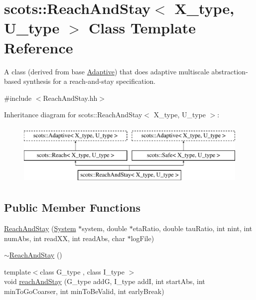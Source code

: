 \hypertarget{classscots_1_1ReachAndStay}{}\section{scots\+:\+:Reach\+And\+Stay$<$ X\+\_\+type, U\+\_\+type $>$ Class Template Reference}
\label{classscots_1_1ReachAndStay}


A class (derived from base \hyperlink{classscots_1_1Adaptive}{Adaptive}) that does adaptive multiscale abstraction-\/based synthesis for a reach-\/and-\/stay specification.  




{\ttfamily \#include $<$Reach\+And\+Stay.\+hh$>$}

Inheritance diagram for scots\+:\+:Reach\+And\+Stay$<$ X\+\_\+type, U\+\_\+type $>$\+:\begin{figure}[H]
\begin{center}
\leavevmode
\includegraphics[height=3.000000cm]{classscots_1_1ReachAndStay}
\end{center}
\end{figure}
\subsection*{Public Member Functions}
\begin{DoxyCompactItemize}
\item 
\hyperlink{classscots_1_1ReachAndStay_ad7b8e64bead2b77ba81d793180b66416}{Reach\+And\+Stay} (\hyperlink{classscots_1_1System}{System} $\ast$system, double $\ast$eta\+Ratio, double tau\+Ratio, int nint, int num\+Abs, int read\+XX, int read\+Abs, char $\ast$log\+File)
\item 
\hyperlink{classscots_1_1ReachAndStay_a03d6d40d05fc810d88965b3f7a78c2fe}{$\sim$\+Reach\+And\+Stay} ()
\item 
{\footnotesize template$<$class G\+\_\+type , class I\+\_\+type $>$ }\\void \hyperlink{classscots_1_1ReachAndStay_a8615d9a4050bbb186a38fe0e3ae97c69}{reach\+And\+Stay} (G\+\_\+type addG, I\+\_\+type addI, int start\+Abs, int min\+To\+Go\+Coarser, int min\+To\+Be\+Valid, int early\+Break)
\end{DoxyCompactItemize}
